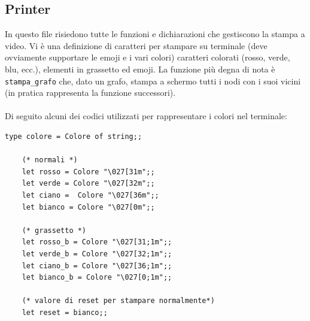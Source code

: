 \subsection{Printer}

In questo file risiedono tutte le funzioni e dichiarazioni che gestiscono la stampa a video. Vi è una definizione di caratteri per stampare su terminale (deve ovviamente supportare le emoji e i vari colori) caratteri colorati (rosso, verde, blu, ecc.), elementi in grassetto ed emoji. La funzione più degna di nota è \lstinline[style=cmd]|stampa_grafo| che, dato un grafo, stampa a schermo tutti i nodi con i suoi vicini (in pratica rappresenta la funzione successori).\\
\ \\
Di seguito alcuni dei codici utilizzati per rappresentare i colori nel terminale: 

\begin{lstlisting}[style=caml, caption={Codici per i colori ed elementi in grassetto}]
	type colore = Colore of string;;
	
	(* normali *)
	let rosso = Colore "\027[31m";;
	let verde = Colore "\027[32m";;
	let ciano =  Colore "\027[36m";;
	let bianco = Colore "\027[0m";;
	
	(* grassetto *)
	let rosso_b = Colore "\027[31;1m";;
	let verde_b = Colore "\027[32;1m";;
	let ciano_b = Colore "\027[36;1m";;
	let bianco_b = Colore "\027[0;1m";;
	
	(* valore di reset per stampare normalmente*)
	let reset = bianco;;
\end{lstlisting}

